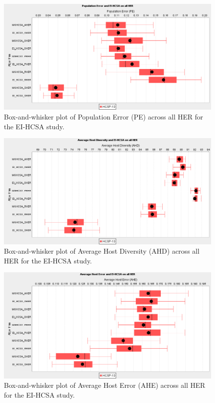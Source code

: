 \begin{figure}[htp]
	\centering
		\includegraphics[scale=0.70]{Hosts/EI-HCSA-PE}
	\caption{Box-and-whisker plot of Population Error (PE) across all HER for the EI-HCSA study.}
	\label{fig:hosts:eihcsa:pe:boxplot}
\end{figure}

\begin{figure}[htp]
	\centering
		\includegraphics[scale=0.70]{Hosts/EI-HCSA-AHD}
	\caption{Box-and-whisker plot of Average Host Diversity (AHD) across all HER for the EI-HCSA study.}
	\label{fig:hosts:eihcsa:ahd:boxplot}
\end{figure}

\begin{figure}[htp]
	\centering
		\includegraphics[scale=0.70]{Hosts/EI-HCSA-AHE}
	\caption{Box-and-whisker plot of Average Host Error (AHE) across all HER for the EI-HCSA study.}
	\label{fig:hosts:eihcsa:ahe:boxplot}
\end{figure}


